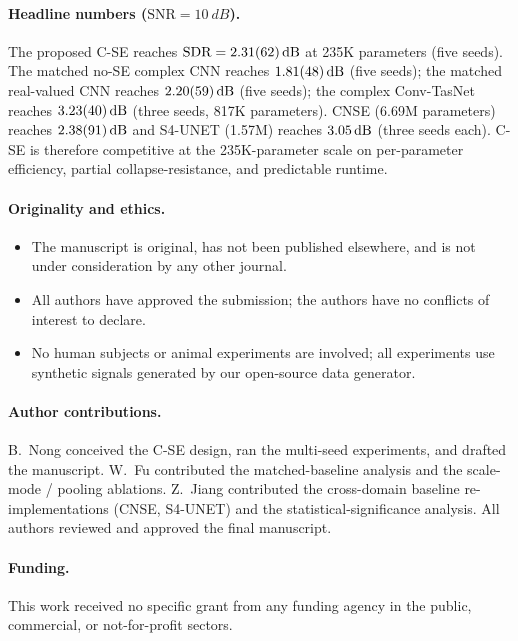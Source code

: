 \documentclass[11pt,a4paper]{article}
\begin{document}
\paragraph{Headline numbers ($\text{SNR}=\SI{10}{dB}$).}
The proposed C-SE reaches $\text{SDR}=\SI{2.31 \pm 0.62}{dB}$ at 235K parameters (five seeds). The matched no-SE complex CNN reaches $\SI{1.81 \pm 0.48}{dB}$ (five seeds); the matched real-valued CNN reaches $\SI{2.20 \pm 0.59}{dB}$ (five seeds); the complex Conv-TasNet reaches $\SI{3.23 \pm 0.40}{dB}$ (three seeds, 817K parameters). CNSE (6.69M parameters) reaches $\SI{2.38 \pm 0.91}{dB}$ and S4-UNET (1.57M) reaches $\SI{3.05 \pm 0.00}{dB}$ (three seeds each). C-SE is therefore competitive at the 235K-parameter scale on per-parameter efficiency, partial collapse-resistance, and predictable runtime.

\paragraph{Originality and ethics.}
\begin{itemize}
\item The manuscript is original, has not been published elsewhere, and is not under consideration by any other journal.
\item All authors have approved the submission; the authors have no conflicts of interest to declare.
\item No human subjects or animal experiments are involved; all experiments use synthetic signals generated by our open-source data generator.
\end{itemize}

\paragraph{Author contributions.}
B.~Nong conceived the C-SE design, ran the multi-seed experiments, and drafted the manuscript. W.~Fu contributed the matched-baseline analysis and the scale-mode / pooling ablations. Z.~Jiang contributed the cross-domain baseline re-implementations (CNSE, S4-UNET) and the statistical-significance analysis. All authors reviewed and approved the final manuscript.

\paragraph{Funding.}
This work received no specific grant from any funding agency in the public, commercial, or not-for-profit sectors.
\end{document}
